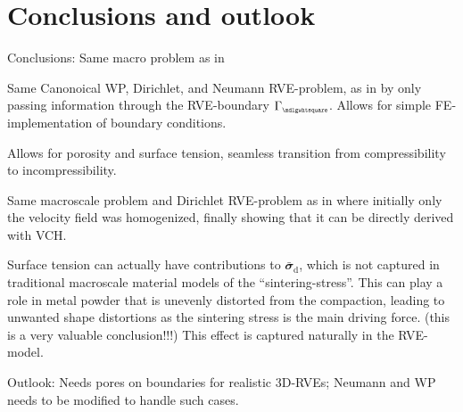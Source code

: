\documentclass[12pt,a4paper]{article}
\renewcommand{\ts}[1]{\mathbfit{#1}}
\renewcommand{\Box}{\mdlgwhtsquare}
\renewcommand{\dev}{\mathrm{d}}
\newcommand{\rve}{
  {\mathchoice
   {\mbox{\scalebox{0.67}{$\Box$}}}
   {\mbox{\scalebox{0.67}{$\Box$}}}
   {\mbox{\scalebox{0.5}{$\Box$}}}
   {\mbox{\scalebox{0.375}{$\Box$}}}
  }
}
\begin{document}
\section{Conclusions and outlook}

Conclusions:
Same macro problem as in \cite{ohman_computational_2014}

Same Canonoical WP, Dirichlet, and Neumann RVE-problem, as in \cite{ohman_computational_2014} by only passing information through the RVE-boundary $\Gamma_\rve$.
Allows for simple FE-implementation of boundary conditions.

Allows for porosity and surface tension, seamless transition from compressibility to incompressibility.


Same macroscale problem and Dirichlet RVE-problem as in \cite{ohman_computational_2012} where initially only the velocity field was homogenized, finally showing that it can be directly derived with VCH.


Surface tension can actually have contributions to $\bar{\ts\sigma}_\dev$, which is not captured in traditional macroscale material models of the ``sintering-stress''. This can play a role in metal powder that is unevenly distorted from the compaction, leading to unwanted shape distortions as the sintering stress is the main driving force. (this is a very valuable conclusion!!!)
This effect is captured naturally in the RVE-model.


Outlook:
Needs pores on boundaries for realistic 3D-RVEs; Neumann and WP needs to be modified to handle such cases.
\end{document}
